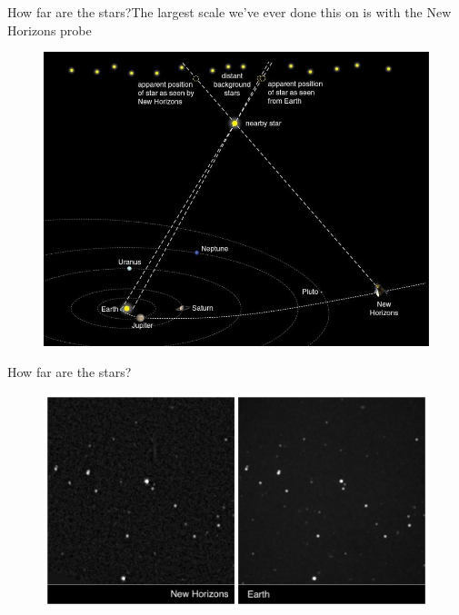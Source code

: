 \documentclass[12pt]{beamer}
\begin{document}
        \begin{frame}{How far are the stars?}{The largest scale we've ever done this on is with the New Horizons probe}
            \begin{figure}
                \includegraphics[scale=0.3]{Parallax_wide.jpg}
            \end{figure}
        \end{frame}
        \begin{frame}{How far are the stars?}
            \begin{figure}
                \includegraphics[scale=0.42]{WolfCrossEyed.png}
            \end{figure}
        \end{frame}
\end{document}
